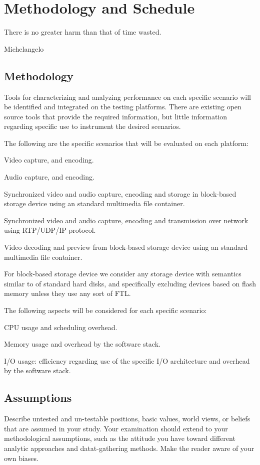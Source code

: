 \chapter{Methodology and Schedule} 
\epigraph{There is no greater harm than that of time wasted.}{Michelangelo}

\section{Methodology}
Tools for characterizing and analyzing performance on each specific scenario will be identified and integrated on the testing platforms. There are existing open source tools that provide the required information, but little information regarding specific use to instrument the desired scenarios.

The following are the specific scenarios that will be evaluated on each platform:
\begin{itemize*}
\item Video capture, and encoding.
\item Audio capture, and encoding.
\item Synchronized video and audio capture, encoding and storage in block-based storage device using an standard multimedia file container.
\item Synchronized video and audio capture, encoding and transmission over network using RTP/UDP/IP protocol.
\item Video decoding and preview from block-based storage device using an standard multimedia file container.
\end{itemize*}

For block-based storage device we consider any storage device with semantics similar to of standard hard disks, and specifically excluding devices based on flash memory unless they use any sort of \ac{FTL}.

The following aspects will be considered for each specific scenario:
\begin{itemize*}
\item CPU usage and scheduling overhead.
\item Memory usage and overhead by the software stack.
\item I/O usage: efficiency regarding use of the specific I/O architecture and overhead by the software stack.
\end{itemize*}

\section{Assumptions}
Describe untested and un-testable positions, basic values, world views, or beliefs that are assumed in your study.
Your examination should extend to your methodological assumptions, such as the attitude you have toward different analytic approaches and datat-gathering methods. Make the reader aware of your own biases.

